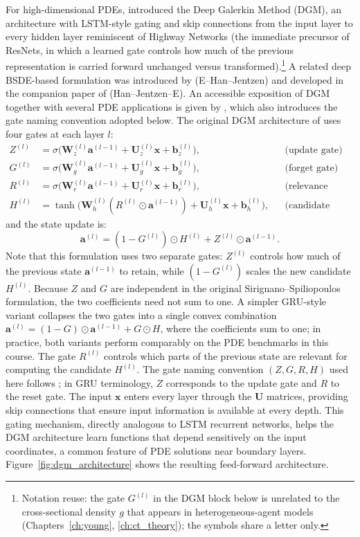 \documentclass[11pt,a4paper]{report}
\newcommand{\x}{\bm{x}}
\newcommand{\bb}{\bm{b}}
\newcommand{\W}{\bm{W}}
\renewcommand{\a}{\bm{a}}
\begin{document}
For high-dimensional PDEs, \citet{sirignano2018dgm} introduced the Deep Galerkin Method (DGM), an architecture with LSTM-style gating \citep{hochreiter1997long} and skip connections from the input layer to every hidden layer reminiscent of Highway Networks \citep{srivastava2015highway} (the immediate precursor of ResNets, in which a learned gate controls how much of the previous representation is carried forward unchanged versus transformed).\footnote{Notation reuse: the gate $G^{(l)}$ in the DGM block below is unrelated to the cross-sectional density $g$ that appears in heterogeneous-agent models (Chapters~\ref{ch:young}, \ref{ch:ct_theory}); the symbols share a letter only.}  A related deep BSDE-based formulation was introduced by \citet{e2017deep} (E--Han--Jentzen) and developed in the companion paper of \citet{han2018solving} (Han--Jentzen--E).  An accessible exposition of DGM together with several PDE applications is given by \citet{al2018solving}, which also introduces the gate naming convention adopted below.  The original DGM architecture of \citet{sirignano2018dgm} uses four gates at each layer $l$:
\begin{align}
Z^{(l)} &= \sigma\!\big(\W_z^{(l)} \a^{(l-1)} + \bm{U}_z^{(l)} \x + \bb_z^{(l)}\big), && \text{(update gate)} \\
G^{(l)} &= \sigma\!\big(\W_g^{(l)} \a^{(l-1)} + \bm{U}_g^{(l)} \x + \bb_g^{(l)}\big), && \text{(forget gate)} \\
R^{(l)} &= \sigma\!\big(\W_r^{(l)} \a^{(l-1)} + \bm{U}_r^{(l)} \x + \bb_r^{(l)}\big), && \text{(relevance gate)} \\
H^{(l)} &= \tanh\!\big(\W_h^{(l)} (R^{(l)} \odot \a^{(l-1)}) + \bm{U}_h^{(l)} \x + \bb_h^{(l)}\big), && \text{(candidate state)}
\end{align}
and the state update is:
\begin{equation}
\a^{(l)} = (1 - G^{(l)}) \odot H^{(l)} + Z^{(l)} \odot \a^{(l-1)}.
\end{equation}
Note that this formulation uses two separate gates: $Z^{(l)}$ controls how much of the previous state $\a^{(l-1)}$ to retain, while $(1 - G^{(l)})$ scales the new candidate $H^{(l)}$.  Because $Z$ and $G$ are independent in the original Sirignano--Spiliopoulos formulation, the two coefficients need not sum to one.  A simpler GRU-style variant \citep{cho2014gru} collapses the two gates into a single convex combination $\a^{(l)} = (1-G) \odot \a^{(l-1)} + G \odot H$, where the coefficients sum to one; in practice, both variants perform comparably on the PDE benchmarks in this course.  The gate $R^{(l)}$ controls which parts of the previous state are relevant for computing the candidate $H^{(l)}$.  The gate naming convention $(Z,G,R,H)$ used here follows \citet{al2018solving}; in GRU terminology, $Z$ corresponds to the update gate and $R$ to the reset gate.  The input $\x$ enters every layer through the $\bm{U}$ matrices, providing skip connections that ensure input information is available at every depth.  This gating mechanism, directly analogous to LSTM recurrent networks, helps the DGM architecture learn functions that depend sensitively on the input coordinates, a common feature of PDE solutions near boundary layers.  Figure~\ref{fig:dgm_architecture} shows the resulting feed-forward architecture.
\end{document}
